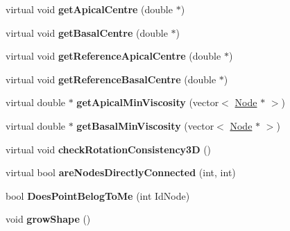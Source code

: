 \begin{DoxyCompactItemize}
\item 
\hypertarget{classShapeBase_a18458e707b8b44f63e51579fbe41c147}{}virtual void {\bfseries get\+Apical\+Centre} (double $\ast$)\label{classShapeBase_a18458e707b8b44f63e51579fbe41c147}

\item 
\hypertarget{classShapeBase_adde98255dadf5e0dcafccc2183d37dbe}{}virtual void {\bfseries get\+Basal\+Centre} (double $\ast$)\label{classShapeBase_adde98255dadf5e0dcafccc2183d37dbe}

\item 
\hypertarget{classShapeBase_aeb9484bea7718e49448ed3ef8a7867fd}{}virtual void {\bfseries get\+Reference\+Apical\+Centre} (double $\ast$)\label{classShapeBase_aeb9484bea7718e49448ed3ef8a7867fd}

\item 
\hypertarget{classShapeBase_a1f3cdb2306ce5848a7efe5af3890d630}{}virtual void {\bfseries get\+Reference\+Basal\+Centre} (double $\ast$)\label{classShapeBase_a1f3cdb2306ce5848a7efe5af3890d630}

\item 
\hypertarget{classShapeBase_a4cdee449e750c5a683f81088a195523f}{}virtual double $\ast$ {\bfseries get\+Apical\+Min\+Viscosity} (vector$<$ \hyperlink{classNode}{Node} $\ast$ $>$)\label{classShapeBase_a4cdee449e750c5a683f81088a195523f}

\item 
\hypertarget{classShapeBase_a16af853ecfeb1557e296f804cfe522f6}{}virtual double $\ast$ {\bfseries get\+Basal\+Min\+Viscosity} (vector$<$ \hyperlink{classNode}{Node} $\ast$ $>$)\label{classShapeBase_a16af853ecfeb1557e296f804cfe522f6}

\item 
\hypertarget{classShapeBase_a4e33b4fea2d126f59ca0bcf73e07a253}{}virtual void {\bfseries check\+Rotation\+Consistency3\+D} ()\label{classShapeBase_a4e33b4fea2d126f59ca0bcf73e07a253}

\item 
\hypertarget{classShapeBase_aae5ef32d56aa383108f2d6912469138f}{}virtual bool {\bfseries are\+Nodes\+Directly\+Connected} (int, int)\label{classShapeBase_aae5ef32d56aa383108f2d6912469138f}

\item 
\hypertarget{classShapeBase_aed4c893952a6afad718a2037e0635296}{}bool {\bfseries Does\+Point\+Belog\+To\+Me} (int Id\+Node)\label{classShapeBase_aed4c893952a6afad718a2037e0635296}

\item 
\hypertarget{classShapeBase_a92ec10be4c8ba3dd3e4b95ccd08bba7b}{}void {\bfseries grow\+Shape} ()\label{classShapeBase_a92ec10be4c8ba3dd3e4b95ccd08bba7b}


\end{DoxyCompactItemize}
